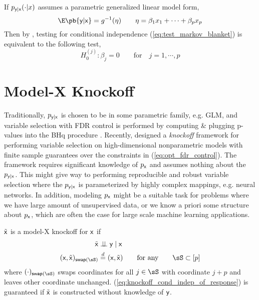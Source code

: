 \documentclass[11pt]{article}
\begin{document}
If $p_{\mathsf{y}|\mathsf{x}}(\cdot|x)$ assumes a parametric generalized linear model form, 
\[
    \E\pb{\ry|\rx} = g^{-1}(\eta)
    \quad\quad
    \eta = \beta_1 x_1 + \cdots + \beta_p x_p    
\]
Then by \cite{candesPanningGoldModelX2017}, testing for conditional independence (\ref{eq:test_markov_blanket}) is equivalent to the following test,
\[
    H_0^{(j)}:
        \beta_j = 0
    \quad\quad\text{for}\quad
        j = 1,\cdots,p
    \label{test_glm}
\]

\section{Model-X Knockoff}

Traditionally, $p_{\mathsf{y}|\mathsf{x}}$ is chosen to be in some parametric family, e.g. GLM, and variable selection with FDR control is performed by computing \& plugging p-values into the BHq procedure \cite{benjaminiControllingFalseDiscovery1995}. Recently, \cite{barberControllingFalseDiscovery2015,candesPanningGoldModelX2017} designed a \textit{knockoff} framework for performing variable selection on high-dimensional nonparametric models with finite sample guarantees over the constraints in (\ref{eq:opt_fdr_control}). The framework requires significant knowledge of $p_{\mathsf{x}}$ and assumes nothing about the $p_{\mathsf{y}|\mathsf{x}}$. This might give way to performing reproducible and robust variable selection where the $p_{\mathsf{y}|\mathsf{x}}$ is parameterized by highly complex mappings, e.g. neural networks. In addition, modeling $p_{\mathsf{x}}$ might be a suitable task for problems where we have large amount of unsupervised data, or we know a priori some structure about $p_{\mathsf{x}}$, which are often the case for large scale machine learning applications. 
\begin{definition*} 
    $\tilde{\mathsf{x}}$ is a model-X knockoff for $\mathsf{x}$ if 
    \begin{align}
        \tilde{\rx} 
            &\dperp \ry \mid \rx 
            \label{eq:knockoff_cond_indep_of_response} \\
        (\rx,\tilde{\rx})_{\textsf{swap}(\sS)}
            &\overset{d}{=} (\rx,\tilde{\rx})
            \quad\quad\text{for any}\quad\quad
            \sS\subset[p]
            \label{eq:knockoff_swap_exchangeability}
    \end{align}
    where $(\cdot)_{\textsf{swap}(\sS)}$ swaps coordinates for all $j\in\sS $ with coordinate $j+p$ and leaves other coordinate unchanged.  (\ref{eq:knockoff_cond_indep_of_response}) is guaranteed if $\tilde{\mathsf{x}}$ is constructed without knowledge of $\mathsf{y}$. 
\end{definition*}
\end{document}
